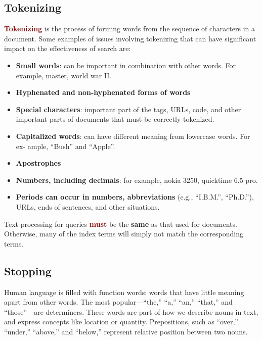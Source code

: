 \subsection{Tokenizing}
\textbf{\textcolor{Maroon}{Tokenizing}} is the process of forming words from the sequence of characters in a document. Some examples of issues involving tokenizing that can have significant impact on the effectiveness of search are:
\begin{itemize}
    \setlength\itemsep{0em}
    \item \textbf{Small words}: can be important in combination with other words. For example, master, world war II.
    \item \textbf{Hyphenated and non-hyphenated forms of words}
    \item \textbf{Special characters}: important part of the tags, URLs, code, and other important parts of documents that must be correctly tokenized.
    \item \textbf{Capitalized words}: can have different meaning from lowercase words. For ex- ample, “Bush” and “Apple”.
    \item \textbf{Apostrophes}
    \item \textbf{Numbers, including decimals}: for example, nokia 3250, quicktime 6.5 pro.
    \item \textbf{Periods can occur in numbers, abbreviations} (e.g., “I.B.M.”, “Ph.D.”), URLs, ends of sentences, and other situations.
\end{itemize}
\vspace{0.25cm}
Text processing for queries \textbf{\textcolor{Maroon}{must}} be the \textbf{same} as that used for documents. Otherwise, many of the index terms will simply not match the corresponding terms.

\subsection{Stopping}
Human language is filled with function words: words that have little meaning apart from other words. The most popular—“the,” “a,” “an,” “that,” and “those”—are determiners. These words are part of how we describe nouns in text, and express concepts like location or quantity. Prepositions, such as “over,” “under,” “above,” and “below,” represent relative position between two nouns.

